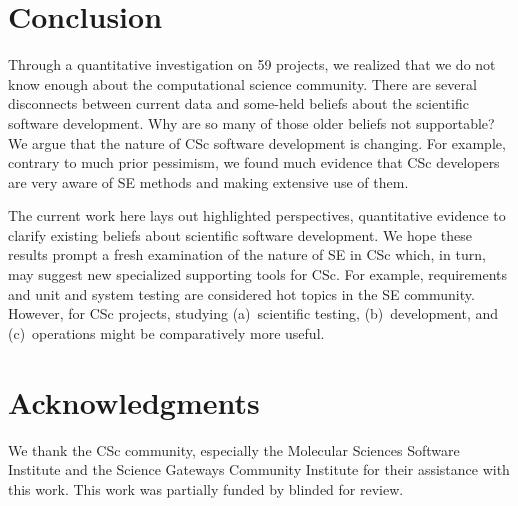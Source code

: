 \documentclass[conference,10pt]{IEEEtran}
\begin{document}
\section{Conclusion}

Through a quantitative investigation on 59 projects, we realized that we do not know enough about the computational science community. There are several disconnects between current data
and some-held beliefs about the scientific software development.
Why are so many of those older beliefs not supportable?
We argue that  the  nature of CSc software development is changing. 
For example, contrary to much prior pessimism, we found much evidence
that CSc developers are very
aware of SE methods and making
extensive use of them.

 
 The current work here lays out highlighted perspectives, quantitative evidence to clarify existing beliefs about scientific software development.
 We hope these results  prompt a fresh examination of the nature of SE in  CSc which, in turn, may suggest new specialized supporting tools for CSc.
For example, requirements and unit and system testing  are considered hot topics in the SE community.
However, for CSc projects,   studying  (a)~scientific testing, (b)~development, and
(c)~operations might be comparatively more useful.





\section{Acknowledgments}

We thank the CSc community, especially the Molecular Sciences Software Institute and the Science Gateways Community Institute for
their assistance with this work. This work was partially funded by blinded for review.





\balance
% 


\end{document}
